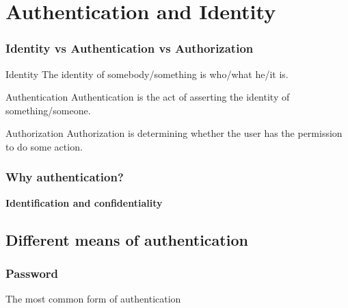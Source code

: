 \section{Authentication and Identity}

\begin{frame}
\frametitle{Identity vs Authentication vs Authorization}
\begin{block}{Identity}
The identity of somebody/something is who/what he/it is.
\end{block}
\begin{block}{Authentication}
Authentication is the act of asserting the identity of something/someone.
\end{block}
\begin{block}{Authorization}
Authorization is determining whether the user has the permission to do some
action.
\end{block}
\end{frame}

\begin{frame}
\frametitle{Why authentication?}
\begin{center}
\textbf{Identification and confidentiality}
\end{center}
\end{frame}

\subsection{Different means of authentication}

\begin{frame}
\frametitle{Password}
\begin{center}
The most common form of authentication
\end{center}
\end{frame}

